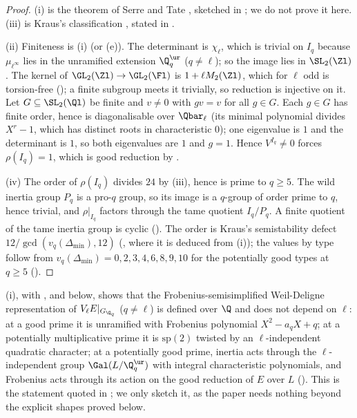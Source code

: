\begin{proof}
(i) is the theorem of Serre and Tate \cite[Section 2]{SerreTate68}, sketched in ; we do not prove it here. (iii) is Kraus's
classification \cite{Kraus90}, stated in .

(ii) Finiteness is (i) (or (e)). The determinant is $\chi_\ell$, which is trivial on $I_q$ because $\mu_{\ell^\infty}$ lies in the
unramified extension $\Q_q^{\ur}$ ($q\ne\ell$); so the image lies in $\SL_2(\Zl)$. The kernel of $\GL_2(\Zl)\to\GL_2(\Fl)$ is $1+\ell M_2(\Zl)$, which for $\ell$ odd is
torsion-free (); a finite subgroup meets it trivially, so reduction is injective on it. Let $G\subseteq\SL_2(\Ql)$ be finite and $v\ne0$
with $gv=v$ for all $g\in G$. Each $g\in G$ has finite order, hence is diagonalisable over $\Qbar_\ell$ (its minimal polynomial divides $X^r-1$,
which has distinct roots in characteristic $0$); one eigenvalue is $1$ and the determinant is $1$, so both eigenvalues are $1$ and $g=1$. Hence
$V^{I_q}\ne0$ forces $\rho(I_q)=1$, which is good reduction by .

(iv) The order of $\rho(I_q)$ divides $24$ by (iii), hence is prime to $q\ge5$. The wild inertia group $P_q$ is a pro-$q$ group, so its image is a
$q$-group of order prime to $q$, hence trivial, and $\rho|_{I_q}$ factors through the tame quotient $I_q/P_q$. A finite quotient of the tame
inertia group is cyclic (). The order is Kraus's semistability defect $12/\gcd(v_q(\Delta_{\min}),12)$ (, where
it is deduced from (i)); the values by type follow from $v_q(\Delta_{\min})=0,2,3,4,6,8,9,10$ for the potentially good types at $q\ge5$
().
\end{proof}

\begin{remark}\label{rem:galrep:wd-independence}
(i), with ,  and  below, shows that the
Frobenius-semisimplified Weil-Deligne representation of $V_\ell E|_{G_{\Q_q}}$ ($q\ne\ell$) is defined over $\Q$ and does not depend on $\ell$: at a good
prime it is unramified with Frobenius polynomial $X^2-a_qX+q$; at a potentially multiplicative prime it is $\mathrm{sp}(2)$ twisted by an
$\ell$-independent quadratic character; at a potentially good prime, inertia acts through the $\ell$-independent group $\Gal(L/\Q_q^{\ur})$ with
integral characteristic polynomials, and Frobenius acts through its action on the good reduction of $E$ over $L$ (\cite[Section 2]{SerreTate68}).
This is the statement quoted in ; we only sketch it, as the paper needs nothing beyond the explicit shapes proved below.
\end{remark}

